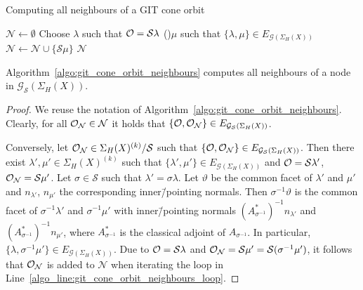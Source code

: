\begin{algorithm}
	\caption{Computing all neighbours of a GIT cone orbit}
	\label{algo:git_cone_orbit_neighbours}
	
	\BlankLine
	$\mathcal{N} \leftarrow \emptyset$\;
	Choose $\lambda$ such that $\mathcal{O} = \mathcal{S}\lambda$\;
	\For(){$\mu$ such that $\{\lambda,\mu\}\in E_{\mathcal{G}(\Sigma_H(X))}$\label{algo_line:git_cone_orbit_neighbours_loop}}{
		$\mathcal{N}\leftarrow \mathcal{N} \cup \{\mathcal{S}\mu\}$\;
	}
	\Return $\mathcal{N}$\;
\end{algorithm}

\begin{prop}
	Algorithm~\ref{algo:git_cone_orbit_neighbours} computes all neighbours of a node in $\mathcal{G}_\mathcal{S}(\Sigma_H(X))$.
\end{prop}
\begin{proof}
	We reuse the notation of Algorithm~\ref{algo:git_cone_orbit_neighbours}. Clearly, for all  $\mathcal{O}_\mathcal{N}\in\mathcal{N}$ it holds that $\{\mathcal{O},\mathcal{O}_\mathcal{N}\}\in E_{\mathcal{G}_\mathcal{S}(\Sigma_H(X))}$.
	
	Conversely, let $\mathcal{O}_\mathcal{N}\in\Sigma_H(X)^{(k)}/\mathcal{S}$ such that $\{\mathcal{O},\mathcal{O}_\mathcal{N}\}\in E_{\mathcal{G}_\mathcal{S}(\Sigma_H(X))}$. Then there exist $\lambda',\mu'\in\Sigma_H(X)^{(k)}$ such that $\{\lambda', \mu'\}\in E_{\mathcal{G}(\Sigma_H(X))}$ and $\mathcal{O} = \mathcal{S}\lambda'$, $\mathcal{O}_\mathcal{N} = \mathcal{S}\mu'$. Let $\sigma\in\mathcal{S}$ such that $\lambda' = \sigma\lambda$. Let $\vartheta$ be the common facet of $\lambda'$ and $\mu'$ and $n_{\lambda'}$, $n_{\mu'}$ the corresponding inner\=/pointing normals. Then $\sigma^{-1}\vartheta$ is the common facet of $\sigma^{-1}\lambda'$ and $\sigma^{-1}\mu'$ with inner\=/pointing normals $(A_{\sigma^{-1}}^*)^{-1} n_{\lambda'}$ and $(A_{\sigma^{-1}}^*)^{-1} n_{\mu'}$, where $A_{\sigma^{-1}}^*$ is the classical adjoint of $A_{\sigma^{-1}}$. In particular, $\{\lambda, \sigma^{-1}\mu'\}\in E_{\mathcal{G}(\Sigma_H(X))}$. Due to $\mathcal{O} = \mathcal{S}\lambda$ and $\mathcal{O}_\mathcal{N} = \mathcal{S}\mu' = \mathcal{S}(\sigma^{-1}\mu')$, it follows that $\mathcal{O}_\mathcal{N}$ is added to $\mathcal{N}$ when iterating the loop in Line~\ref{algo_line:git_cone_orbit_neighbours_loop}.
\end{proof}

